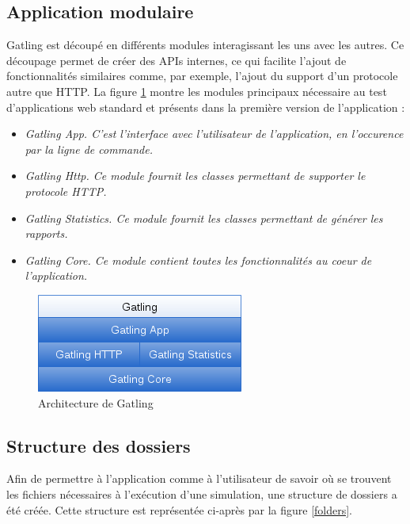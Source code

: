 \subsection{Application modulaire}
Gatling est découpé en différents modules interagissant les uns avec les autres. Ce découpage permet de créer des APIs internes, ce qui facilite l'ajout de fonctionnalités similaires comme, par exemple, l'ajout du support d'un protocole autre que HTTP. La figure \ref{arch} montre les modules principaux nécessaire au test d'applications web standard et présents dans la première version de l'application :
\begin{itemize}
  \item \em{Gatling App}. C'est l'interface avec l'utilisateur de l'application, en l'occurence par la ligne de commande.
  \item \em{Gatling Http}. Ce module fournit les classes permettant de supporter le protocole HTTP.
  \item \em{Gatling Statistics}. Ce module fournit les classes permettant de générer les rapports.
  \item \em{Gatling Core}. Ce module contient toutes les fonctionnalités au coeur de l'application.
\end{itemize}

\begin{figure}[h]
\begin{center}
\includegraphics{img/arch.png}
\end{center}
\caption{Architecture de Gatling}
\label{arch}
\end{figure}

\subsection{Structure des dossiers}
Afin de permettre à l'application comme à l'utilisateur de savoir où se trouvent les fichiers nécessaires à l'exécution d'une simulation, une structure de dossiers a été créée. Cette structure est représentée ci-après par la figure \ref{folders}.

